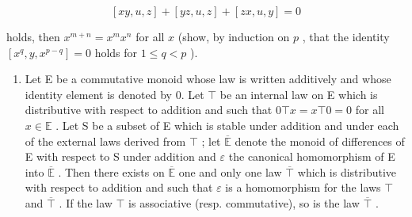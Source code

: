 \[
[ x y, u, z ] + [ y z, u, z ] + [ z x, u, y ] = 0
\]

holds, then \(x^{m + n} = x^m x^n\) for all \(x\) (show, by induction on \(p\) , that the identity \([x^q, y, x^{p - q}] = 0\) holds for \(1 \leqslant q < p\) ).

\begin{enumerate}
\def\labelenumi{\arabic{enumi}.}
\setcounter{enumi}{9}
\tightlist
\item
  Let E be a commutative monoid whose law is written additively and whose identity element is denoted by 0. Let \(\top\) be an internal law on E which is distributive with respect to addition and such that \(0 \top x = x \top 0 = 0\) for all \(x \in \mathbb{E}\) . Let S be a subset of E which is stable under addition and under each of the external laws derived from \(\top\) ; let \(\overline{\mathbb{E}}\) denote the monoid of differences of E with respect to S under addition and \(\varepsilon\) the canonical homomorphism of E into \(\overline{\mathbb{E}}\) . Then there exists on \(\overline{\mathbb{E}}\) one and only one law \(\overline{\top}\) which is distributive with respect to addition and such that \(\varepsilon\) is a homomorphism for the laws \(\top\) and \(\overline{\top}\) . If the law \(\top\) is associative (resp. commutative), so is the law \(\overline{\top}\) .
\end{enumerate}

